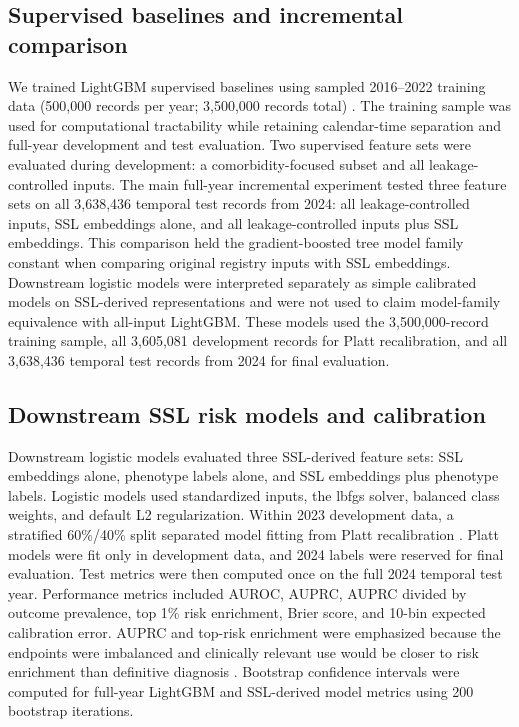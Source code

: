 \documentclass[pdflatex,sn-vancouver-num]{sn-jnl}
\begin{document}
\subsection{Supervised baselines and incremental comparison}\label{subsec:baselines}

We trained LightGBM supervised baselines using sampled 2016--2022 training data (500,000 records per year; 3,500,000 records total) \cite{ke2017lightgbm}. The training sample was used for computational tractability while retaining calendar-time separation and full-year development and test evaluation. Two supervised feature sets were evaluated during development: a comorbidity-focused subset and all leakage-controlled inputs. The main full-year incremental experiment tested three feature sets on all 3,638,436 temporal test records from 2024: all leakage-controlled inputs, SSL embeddings alone, and all leakage-controlled inputs plus SSL embeddings. This comparison held the gradient-boosted tree model family constant when comparing original registry inputs with SSL embeddings. Downstream logistic models were interpreted separately as simple calibrated models on SSL-derived representations and were not used to claim model-family equivalence with all-input LightGBM. These models used the 3,500,000-record training sample, all 3,605,081 development records for Platt recalibration, and all 3,638,436 temporal test records from 2024 for final evaluation.

\subsection{Downstream SSL risk models and calibration}\label{subsec:calibration}

Downstream logistic models evaluated three SSL-derived feature sets: SSL embeddings alone, phenotype labels alone, and SSL embeddings plus phenotype labels. Logistic models used standardized inputs, the lbfgs solver, balanced class weights, and default L2 regularization. Within 2023 development data, a stratified 60\%/40\% split separated model fitting from Platt recalibration \cite{platt1999probabilistic}. Platt models were fit only in development data, and 2024 labels were reserved for final evaluation. Test metrics were then computed once on the full 2024 temporal test year. Performance metrics included AUROC, AUPRC, AUPRC divided by outcome prevalence, top 1\% risk enrichment, Brier score, and 10-bin expected calibration error. AUPRC and top-risk enrichment were emphasized because the endpoints were imbalanced and clinically relevant use would be closer to risk enrichment than definitive diagnosis \cite{davis2006precision}. Bootstrap confidence intervals were computed for full-year LightGBM and SSL-derived model metrics using 200 bootstrap iterations.
\end{document}
